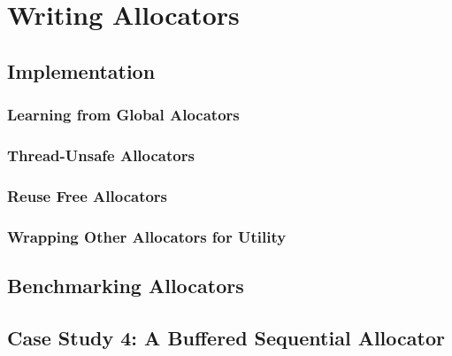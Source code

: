 \chapter{Writing Allocators}

\section{Implementation}
\subsection{Learning from Global Alocators}
\subsection{Thread-Unsafe Allocators}
\subsection{Reuse Free Allocators}
\subsection{Wrapping Other Allocators for Utility}
\section{Benchmarking Allocators}
\section{Case Study 4: A Buffered Sequential Allocator}
